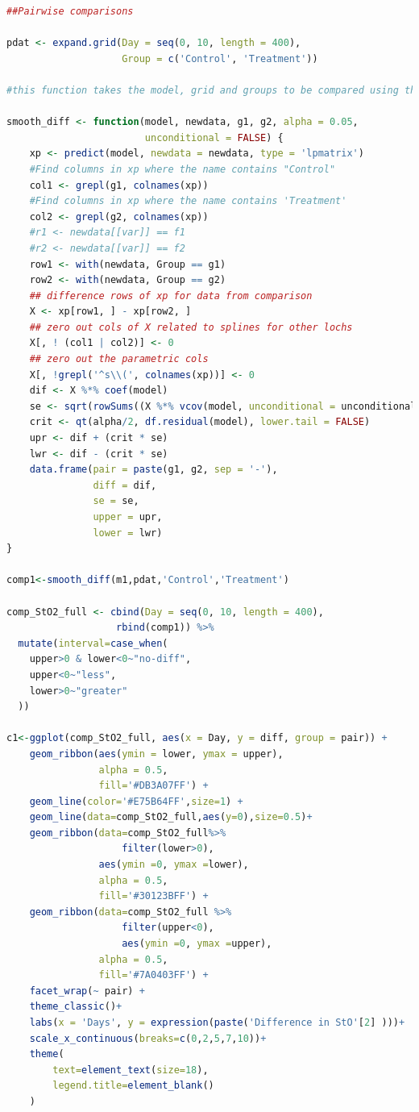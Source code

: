\documentclass[
]{article}
\begin{document}
\begin{lstlisting}[language=R]
##Pairwise comparisons

pdat <- expand.grid(Day = seq(0, 10, length = 400),
                    Group = c('Control', 'Treatment'))

#this function takes the model, grid and groups to be compared using the lpmatrix

smooth_diff <- function(model, newdata, g1, g2, alpha = 0.05,
                        unconditional = FALSE) {
    xp <- predict(model, newdata = newdata, type = 'lpmatrix')
    #Find columns in xp where the name contains "Control"
    col1 <- grepl(g1, colnames(xp))
    #Find columns in xp where the name contains 'Treatment'
    col2 <- grepl(g2, colnames(xp))
    #r1 <- newdata[[var]] == f1
    #r2 <- newdata[[var]] == f2
    row1 <- with(newdata, Group == g1)
    row2 <- with(newdata, Group == g2)
    ## difference rows of xp for data from comparison
    X <- xp[row1, ] - xp[row2, ]
    ## zero out cols of X related to splines for other lochs
    X[, ! (col1 | col2)] <- 0
    ## zero out the parametric cols
    X[, !grepl('^s\\(', colnames(xp))] <- 0
    dif <- X %*% coef(model)
    se <- sqrt(rowSums((X %*% vcov(model, unconditional = unconditional)) * X))
    crit <- qt(alpha/2, df.residual(model), lower.tail = FALSE)
    upr <- dif + (crit * se)
    lwr <- dif - (crit * se)
    data.frame(pair = paste(g1, g2, sep = '-'),
               diff = dif,
               se = se,
               upper = upr,
               lower = lwr)
}

comp1<-smooth_diff(m1,pdat,'Control','Treatment')

comp_StO2_full <- cbind(Day = seq(0, 10, length = 400),
                   rbind(comp1)) %>%
  mutate(interval=case_when(
    upper>0 & lower<0~"no-diff",
    upper<0~"less",
    lower>0~"greater"
  ))

c1<-ggplot(comp_StO2_full, aes(x = Day, y = diff, group = pair)) +
    geom_ribbon(aes(ymin = lower, ymax = upper),
                alpha = 0.5,
                fill='#DB3A07FF') +
    geom_line(color='#E75B64FF',size=1) +
    geom_line(data=comp_StO2_full,aes(y=0),size=0.5)+
    geom_ribbon(data=comp_StO2_full%>%
                    filter(lower>0),
                aes(ymin =0, ymax =lower),
                alpha = 0.5,
                fill='#30123BFF') +
    geom_ribbon(data=comp_StO2_full %>%
                    filter(upper<0),
                    aes(ymin =0, ymax =upper),
                alpha = 0.5,
                fill='#7A0403FF') +
    facet_wrap(~ pair) +
    theme_classic()+
    labs(x = 'Days', y = expression(paste('Difference in StO'[2] )))+
    scale_x_continuous(breaks=c(0,2,5,7,10))+
    theme(
        text=element_text(size=18),
        legend.title=element_blank()
    )




\end{lstlisting}
\end{document}
